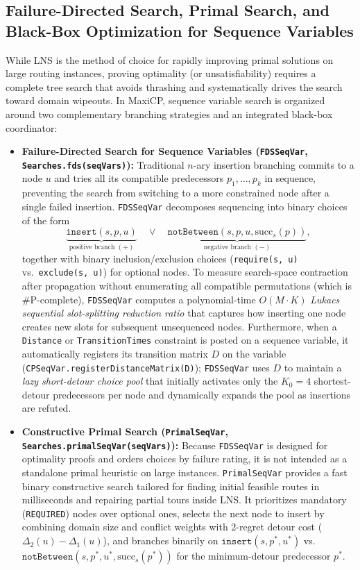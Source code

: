 \documentclass[11pt, a4paper]{scrartcl}
\newcommand{\maxicp}{\textsf{MaxiCP}}
\begin{document}
\subsection{Failure-Directed Search, Primal Search, and Black-Box Optimization for Sequence Variables}
\label{sec:fds-blackbox-seqvar}

While LNS is the method of choice for rapidly improving primal solutions on large routing instances, proving optimality (or unsatisfiability) requires a complete tree search that avoids thrashing and systematically drives the search toward domain wipeouts. In \maxicp, sequence variable search is organized around two complementary branching strategies and an integrated black-box coordinator:
\begin{itemize}
    \item \textbf{Failure-Directed Search for Sequence Variables (\texttt{FDSSeqVar}, \texttt{Searches.fds(seqVars)}):}
    Traditional $n$-ary insertion branching commits to a node $u$ and tries all its compatible predecessors $p_1, \dots, p_k$ in sequence, preventing the search from switching to a more constrained node after a single failed insertion. \texttt{FDSSeqVar} decomposes sequencing into binary choices of the form
    \[
        \underbrace{\texttt{insert}(s, p, u)}_{\text{positive branch } (+)}
        \quad \lor \quad
        \underbrace{\texttt{notBetween}(s, p, u, \text{succ}_s(p))}_{\text{negative branch } (-)},
    \]
    together with binary inclusion/exclusion choices (\texttt{require(s, u)} vs.\ \texttt{exclude(s, u)}) for optional nodes.
    To measure search-space contraction after propagation without enumerating all compatible permutations (which is $\#\text{P}$-complete), \texttt{FDSSeqVar} computes a polynomial-time $O(M \cdot K)$ \emph{Lukacs sequential slot-splitting reduction ratio} that captures how inserting one node creates new slots for subsequent unsequenced nodes.
    Furthermore, when a \texttt{Distance} or \texttt{TransitionTimes} constraint is posted on a sequence variable, it automatically registers its transition matrix $D$ on the variable (\texttt{CPSeqVar.registerDistanceMatrix(D)}); \texttt{FDSSeqVar} uses $D$ to maintain a \emph{lazy short-detour choice pool} that initially activates only the $K_0 = 4$ shortest-detour predecessors per node and dynamically expands the pool as insertions are refuted.
    \item \textbf{Constructive Primal Search (\texttt{PrimalSeqVar}, \texttt{Searches.primalSeqVar(seqVars)}):}
    Because \texttt{FDSSeqVar} is designed for optimality proofs and orders choices by failure rating, it is not intended as a standalone primal heuristic on large instances. \texttt{PrimalSeqVar} provides a fast binary constructive search tailored for finding initial feasible routes in milliseconds and repairing partial tours inside LNS. It prioritizes mandatory (\texttt{REQUIRED}) nodes over optional ones, selects the next node to insert by combining domain size and conflict weights with 2-regret detour cost ($\Delta_2(u) - \Delta_1(u)$), and branches binarily on $\texttt{insert}(s, p^*, u^*)$ vs.\ $\texttt{notBetween}(s, p^*, u^*, \text{succ}_s(p^*))$ for the minimum-detour predecessor $p^*$.

\end{itemize}
\end{document}
